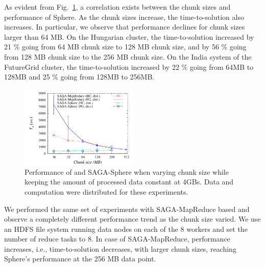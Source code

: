 \documentclass[3p,twocolumn]{elsarticle}
\begin{document}
As evident from Fig.~\ref{fig:sphere_mr_chunksize}, a correlation
exists between the chunk sizes and performance of Sphere.  As the
chunk sizes increase, the time-to-solution also increases. In
particular, we observe that performance declines for chunk sizes
larger than 64 MB. On the Hungarian cluster, the time-to-solution
increased by 21 \% going from 64 MB chunk size to 128 MB chunk
size, and by 56 \% going from 128 MB chunk size to the 256 MB
chunk size. On the India system of the FutureGrid cluster, the time-to-solution increased
by 22 \% going from 64MB to 128MB and 25 \% going from 128MB
to 256MB.



\begin{figure}[htb!]
 \dnnn\dnnn
 \includegraphics[width=0.5\textwidth]{figures/sphere_mr_varying_chunksize.pdf}
 \caption{
   Performance of \sagamapreduce and
   SAGA-Sphere when varying chunk size while keeping the amount
   of processed data constant at 4GBs. Data and computation were
   distributed for these experiments.
   \label{fig:sphere_mr_chunksize}
 }
\end{figure}

We performed the same set of experiments with SAGA-MapReduce based \wc
and observe a completely different performance trend as the chunk size
varied.  We use an HDFS file system running data nodes on each of the
8 workers and set the number of reduce tasks to 8.  In case of
SAGA-MapReduce, performance increases, i.e., time-to-solution
decreases, with larger chunk sizes, reaching Sphere's performance at
the 256 MB data point.
\end{document}
